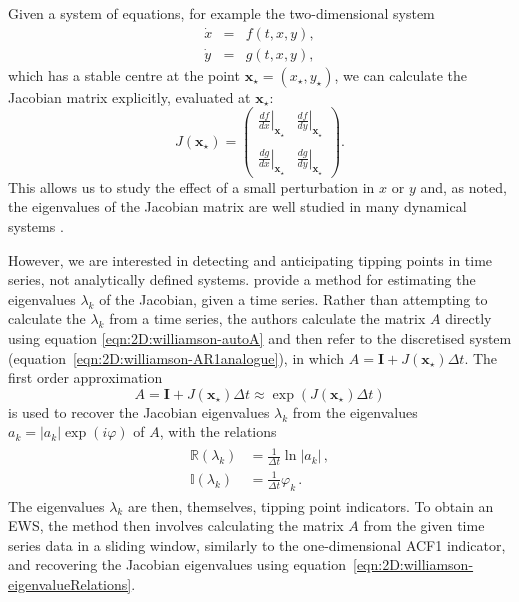 Given a system of equations, for example the two-dimensional system
	\begin{equation}
		\begin{array}{rcl}
			\dot{x}&=&f(t,x,y),\\
			\dot{y}&=&g(t,x,y),
		\end{array}
	\end{equation}
which has a stable centre at the point $\mathbf{x}_\star=(x_\star, y_\star)$, we can calculate the Jacobian matrix explicitly, evaluated at $\mathbf{x}_\star$:
	\begin{equation}
		J(\mathbf{x}_\star) = \left(\begin{array}{cc}
		\left. \frac{df}{dx}\right|_{\mathbf{x}_\star} & \left. \frac{df}{dy}\right|_{\mathbf{x}_\star}\\
		~\\
		\left. \frac{dg}{dx}\right|_{\mathbf{x}_\star} & \left. \frac{dg}{dy}\right|_{\mathbf{x}_\star}
		\end{array}\right).
	\end{equation}
This allows us to study the effect of a small perturbation in $x$ or $y$ and, as noted, the eigenvalues of the Jacobian matrix are well studied in many dynamical systems \citep{thompson2002nonlinear}.

However, we are interested in detecting and anticipating tipping points in time series, not analytically defined systems. \citet{williamson2015} provide a method for estimating the eigenvalues $\lambda_k$ of the Jacobian, given a time series. Rather than attempting to calculate the $\lambda_k$ from a time series, the authors calculate the matrix $A$ directly using equation \ref{eqn:2D:williamson-autoA} and then refer to the discretised system (equation~\ref{eqn:2D:williamson-AR1analogue}), in which $A = \mathbf{I}+J(\mathbf{x}_\star)\Delta t$. The first order approximation 
	\begin{equation}
		A = \mathbf{I}+J(\mathbf{x}_\star)\Delta t \approx \exp(J(\mathbf{x}_\star)\Delta t)
		\label{eqn_jacobian_justification}
	\end{equation}
is used to recover the Jacobian eigenvalues $\lambda_k$ from the eigenvalues $a_k = |a_k|\exp(i\varphi)$ of $A$, with the relations 
	\begin{align}
		\begin{split}
			\mathbb{R}(\lambda_k) &= \frac{1}{\Delta t}\ln|a_k|\,,\\
			\mathbb{I}(\lambda_k) &= \frac{1}{\Delta t} \varphi_k\,.
		\end{split}
		\label{eqn:2D:williamson-eigenvalueRelations}
	\end{align}
The eigenvalues $\lambda_k$ are then, themselves,  tipping point indicators. To obtain an EWS, the method then involves calculating the matrix $A$ from the given time series data in a sliding window, similarly to the one-dimensional ACF1 indicator, and recovering the Jacobian eigenvalues using equation~\ref{eqn:2D:williamson-eigenvalueRelations}.

